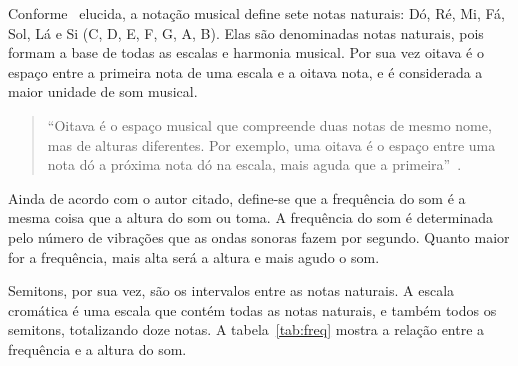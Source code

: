 \documentclass{sbrt}
\begin{document}
Conforme~\cite{moretti2003prototipo} elucida, a notação musical define sete notas naturais: Dó, Ré, Mi, Fá, Sol, Lá e Si (C, D, E, F, G, A, B). Elas são denominadas notas naturais, pois formam a base de todas as escalas e harmonia musical. Por sua vez oitava é o espaço entre a primeira nota de uma escala e a oitava nota, e é considerada a maior unidade de som musical.

\begin{quote}
  ``Oitava é o espaço musical que compreende duas notas de mesmo nome, mas de alturas diferentes. Por exemplo, uma oitava é o espaço entre uma nota dó a próxima nota dó na escala, mais aguda que a primeira''~\cite{moretti2003prototipo}.
\end{quote}


Ainda de acordo com o autor citado, define-se que a frequência do som é a mesma coisa que a altura do som ou toma. A frequência do som é determinada pelo número de vibrações que as ondas sonoras fazem por segundo. Quanto maior for a frequência, mais alta será a altura e mais agudo o som.

Semitons, por sua vez, são os intervalos entre as notas naturais. A escala cromática é uma escala que contém todas as notas naturais, e também todos os semitons, totalizando doze notas. A tabela~\ref{tab:freq} mostra a relação entre a frequência e a altura do som.
\end{document}
